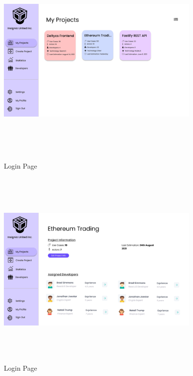 \begin{figure}[H]
\includegraphics[height=10cm, width=0.9\textwidth]{./images/prototype/0003}
\centering 
\caption{Login Page}
\label{fig:prototype1}

\includegraphics[height=10cm, width=0.9\textwidth]{./images/prototype/0004}
\centering 
\caption{Login Page}
\label{fig:prototype1}
\end{figure}

